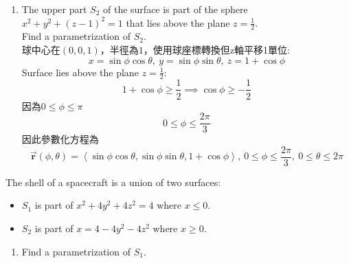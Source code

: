 ﻿\documentclass[12pt,a4paper]{article}
\begin{document}
\begin{problems}
\begin{enumerate}
\begin{equation}
    x = \sin\phi\cos\theta,~
    y = \sin\phi\sin\theta,~
    z = \cos\phi
  \end{equation}
  Surface lies below the plane $z=\frac{1}{2}$:
  \begin{equation}
    z \leq \frac{1}{2} \implies \cos\phi \leq \frac{1}{2}
  \end{equation}
  因為$0\leq\phi\leq\pi$
  \begin{equation}
    \frac{\pi}{3}\leq\phi\leq\pi
  \end{equation}
  因此參數化方程為
  \begin{equation}
    \vec{\mathbf{r}}(\phi,\theta) = \left<
      \sin\phi\cos\theta, \sin\phi\sin\theta, \cos\phi
    \right>,~\frac{\pi}{3}\leq\phi\leq\pi,~0\leq\theta\leq2\pi
  \end{equation}
  \item The upper part $S_2$ of the surface is part of the sphere $x^2+y^2+(z-1)^2 = 1$ that lies above the plane $z=\frac{1}{2}$.\\
  Find a parametrization of $S_2$.\\
  球中心在$(0,0,1)$，半徑為$1$，使用球座標轉換但z軸平移1單位:
  \begin{equation}
    x = \sin\phi\cos\theta,~
    y = \sin\phi\sin\theta,~
    z = 1 + \cos\phi
  \end{equation}
  Surface lies above the plane $z=\frac{1}{2}$:
  \begin{equation}
    1 + \cos \phi \geq \frac{1}{2} \implies \cos\phi \geq -\frac{1}{2}
  \end{equation}
  因為$0\leq\phi\leq\pi$
  \begin{equation}
    0 \leq \phi \leq \frac{2\pi}{3}
  \end{equation}
  因此參數化方程為
  \begin{equation}
    \vec{\mathbf{r}}(\phi,\theta) = \left<
      \sin\phi\cos\theta, \sin\phi\sin\theta, 1 + \cos\phi
    \right>,~0\leq\phi\leq\frac{2\pi}{3},~0\leq\theta\leq2\pi
  \end{equation}
\end{enumerate}
\problem{}
The shell of a spacecraft is a union of two surfaces:
\begin{itemize}
  \item $S_1$ is part of $x^2+4y^2+4z^2 =4$ where $x\leq 0$.
  \item $S_2$ is part of $x=4-4y^2-4z^2$ where $x\geq 0$.
\end{itemize}
\begin{enumerate}
  \item Find a parametrization of $S_1$.\\

\end{enumerate}
\end{problems}
\end{document}
